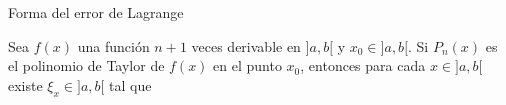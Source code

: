  
\begin{frame}{Forma del error de Lagrange}

  \begin{center}
    
  \end{center}


  
    Sea $f(x)$ una función $n + 1$ veces derivable en $]a, b[$
    y $x_0 \in]a, b[$. Si $P_n(x)$ es el polinomio de
    Taylor de $f (x)$ en el punto $x_0$, entonces para cada $x \in]a, b[$
    existe $\xi_x \in]a, b[$ tal que   
  

    \begin{center}
  \end{center}
    
        

  
  
\end{frame}